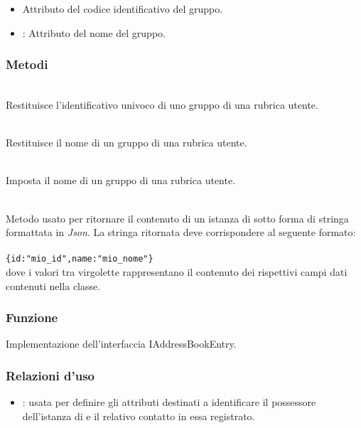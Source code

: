 \begin{itemize}
	\item{}
	Attributo del codice identificativo del gruppo.
	\item{}:
	Attributo del nome del gruppo.
\end{itemize}

\subsubsection*{Metodi}

\begin{description}
	\item{}\\
	Restituisce l'identificativo univoco di uno gruppo di una rubrica utente.
	\item{}\\
	Restituisce il nome di un gruppo di una rubrica utente.
	\item{}\\
	Imposta il nome di un gruppo di una rubrica utente.
	\item{}\\
	Metodo usato per ritornare il contenuto di un istanza di  sotto forma di stringa formattata in \textit{Json}. La stringa ritornata deve corrispondere al seguente formato:\\\\
	\verb|{id:"mio_id",name:"mio_nome"}|\\
	
	dove i valori tra virgolette rappresentano il contenuto dei rispettivi campi dati contenuti nella classe.
\end{description}


\subsubsection*{Funzione}
Implementazione dell'interfaccia IAddressBookEntry.

\subsubsection*{Relazioni d'uso}

\begin{itemize}
	\item {}: usata per definire gli attributi destinati a identificare il possessore dell'istanza di  e il relativo contatto in essa registrato.
\end{itemize}

